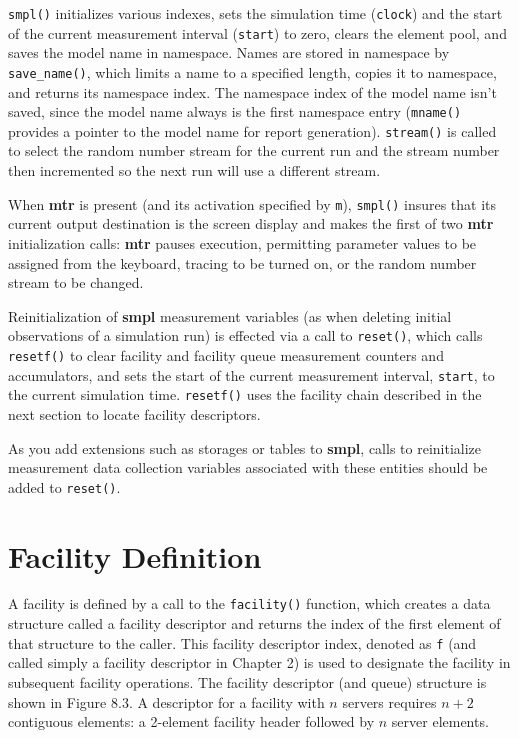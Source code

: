 \texttt{smpl()} initializes various indexes, sets the simulation time (\texttt{clock})
and the start of the current measurement interval (\texttt{start}) to zero, clears the
element pool, and saves the model name in namespace. Names are stored in
namespace by \texttt{save\_name()}, which limits a name to a specified length,
copies it to namespace, and returns its namespace index. The namespace
index of the model name isn't saved, since the model name always is the first
namespace entry (\texttt{mname()} provides a pointer to the model name for report
generation). \texttt{stream()} is called to select the random number stream for the
current run and the stream number then incremented so the next run will use a
different stream.

When \textbf{mtr} is present (and its activation specified by \texttt{m}), \texttt{smpl()} insures
that its current output destination is the screen display and makes the first
of two \textbf{mtr} initialization calls: \textbf{mtr} pauses execution, permitting parameter
values to be assigned from the keyboard, tracing to be turned on, or the
random number stream to be changed.

Reinitialization of \textbf{smpl} measurement variables (as when deleting initial
observations of a simulation run) is effected via a call to \texttt{reset()},
which calls \texttt{resetf()} to clear facility and facility queue measurement
counters and accumulators, and sets the start of the current measurement
interval, \texttt{start}, to the current simulation time. \texttt{resetf()} uses the facility
chain described in the next section to locate facility descriptors.

As you add extensions such as storages or tables to \textbf{smpl}, calls to
reinitialize measurement data collection variables associated with these
entities should be added to \texttt{reset()}.

\section{Facility Definition}

A facility is defined by a call to the \texttt{facility()} function, which
creates a data structure called a facility descriptor and returns the index of
the first element of that structure to the caller. This facility descriptor
index, denoted as \texttt{f} (and called simply a facility descriptor in Chapter 2) is
used to designate the facility in subsequent facility operations. The facility
descriptor (and queue) structure is shown in Figure 8.3. A descriptor for a
facility with $n$ servers requires $n+2$ contiguous elements: a 2-element facility
header followed by $n$ server elements.

